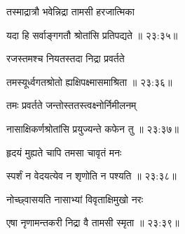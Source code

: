{\devanagarifont तस्माद्रात्रौ भवेन्निद्रा तामसी हरजात्मिका \thinspace{\dandab} \dontdisplaylinenum }%


{\devanagarifont यदा हि सर्वाङ्गगतौ श्रोतांसि प्रतिपद्यते {॥ २३:३५॥} \veg\dontdisplaylinenum }%

{\devanagarifont रजस्तमश्च नियतस्तदा निद्रा प्रवर्तते \thinspace{\dandab} \dontdisplaylinenum }%


{\devanagarifont तमस्यूर्ध्वगतश्रोतो ह्यक्षिपक्ष्मासमाश्रिता {॥ २३:३६॥} \veg\dontdisplaylinenum }%

{\devanagarifont तमः प्रवर्तते जन्तोस्ततस्त्वक्ष्नोर्निमीलनम् \thinspace{\dandab} \dontdisplaylinenum }%


{\devanagarifont नासाक्षिकर्णश्रोतांसि प्रयुज्यन्ते कफेन तु {॥ २३:३७॥} \veg\dontdisplaylinenum }%

{\devanagarifont हृदयं मुह्यते चापि तमसा चावृतं मनः \thinspace{\dandab} \dontdisplaylinenum }%
 

{\devanagarifont स्पर्शं न वेदयत्येव न शृणोति न पश्यति {॥ २३:३८॥} \veg\dontdisplaylinenum }%
 
{\devanagarifont नोच्छ्वासयति नासाभ्यां विवृताक्षिमुखो नरः \thinspace{\dandab} \dontdisplaylinenum }%


{\devanagarifont एषा नृणामन्तकरी निद्रा वै तामसी स्मृता {॥ २३:३९॥} \veg\dontdisplaylinenum }%

